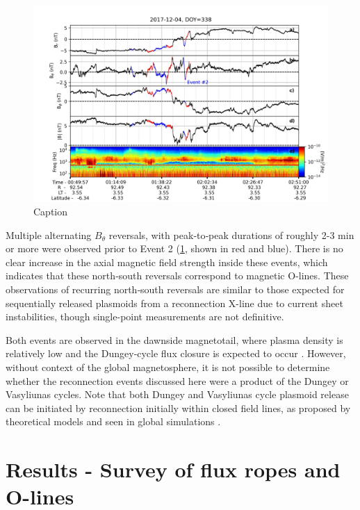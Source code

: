 \begin{figure}
    \centering
    \includegraphics[width=\textwidth]{images5/event-2-context.jpg}
    \caption{Caption}
    \label{fig:event-2-context}
\end{figure}

Multiple alternating $B_\theta$ reversals, with peak‐to‐peak durations of roughly 2-3 min or more were observed prior to Event 2 (\ref{fig:event-2-context}, shown in red and blue). There is no clear increase in the axial magnetic field strength inside these events, which indicates that these north‐south reversals correspond to magnetic O-lines. These observations of recurring north‐south reversals are similar to those expected for sequentially released plasmoids from a reconnection X-line due to current sheet instabilities, though single-point measurements are not definitive.

Both events are observed in the dawnside magnetotail, where plasma density is relatively low and the Dungey‐cycle flux closure is expected to occur \cite{Cowley2003b}. However, without context of the global magnetosphere, it is not possible to determine whether the reconnection events discussed here were a product of the Dungey or Vasyliunas cycles. Note that both Dungey and Vasyliunas cycle plasmoid release can be initiated by reconnection initially within closed field lines, as proposed by theoretical models \cite{Cowley2008} and seen in global simulations \cite{Sarkango2019}.

\section{Results - Survey of flux ropes and O-lines}

